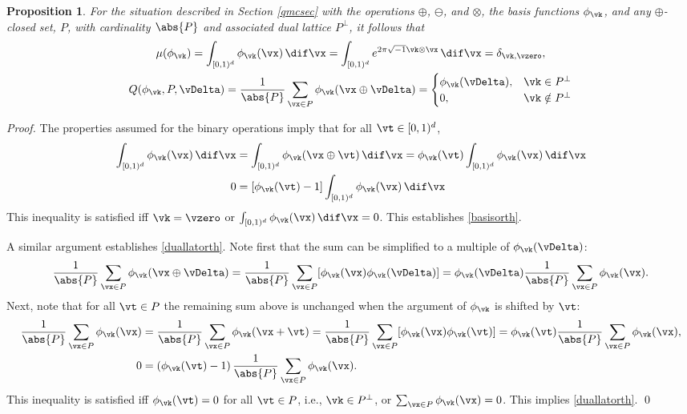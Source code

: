 \documentclass[graybox]{svmult}
\newcommand{\cube}{[0,1)^d}
\newtheorem{prop}[theorem]{Proposition}
\begin{document}
\begin{prop}\label{latnetprop} For the situation described in Section \ref{qmcsec} with the operations $\oplus$, $\ominus$, and $\otimes$, the basis functions $\phi_{\vk}$, and any $\oplus$-closed set, $P$, with cardinality $\abs{P}$ and associated dual lattice $P^{\perp}$, it follows that 
\begin{gather}
\label{basisorth}
\mu(\phi_{\vk})= \int_{\cube} \phi_{\vk}(\vx) \, \dif \vx = \int_{\cube} e^{2 \pi \sqrt{-1} \vk \otimes \vx} \, \dif \vx = \delta_{\vk, \vzero}, \\
\label{duallatorth}
Q(\phi_{\vk},P,\vDelta)= \frac{1}{\abs{P}}\sum_{\vx \in P} \phi_{\vk}(\vx \oplus \vDelta) = \begin{cases} \phi_{\vk}(\vDelta), & \vk \in P^{\perp} \\ 0, & \vk \notin P^{\perp}
\end{cases}
\end{gather}
\end{prop}
\begin{proof}
The properties assumed for the binary operations imply that for all $\vt \in \cube$,
\begin{align*}
\int_{\cube} \phi_{\vk}(\vx) \, \dif \vx &= \int_{\cube} \phi_{\vk}(\vx \oplus \vt) \, \dif \vx = \phi_{\vk}(\vt) \int_{\cube} \phi_{\vk}(\vx) \, \dif \vx\\
0 & = \left [\phi_{\vk}(\vt) -1 \right] \int_{\cube} \phi_{\vk}(\vx) \, \dif \vx
\end{align*}
This inequality is satisfied iff $\vk=\vzero$ or $\int_{\cube} \phi_{\vk}(\vx) \, \dif \vx =0$.  This establishes \eqref{basisorth}. 

A similar argument establishes \eqref{duallatorth}.  Note first that the sum can be simplified to a multiple of $\phi_{\vk}(\vDelta)$:
\begin{equation*}
\frac{1}{\abs{P}}\sum_{\vx \in P} \phi_{\vk}(\vx \oplus \vDelta) 
= \frac{1}{\abs{P}}\sum_{\vx \in P} [\phi_{\vk}(\vx) \phi_{\vk}(\vDelta)] = \phi_{\vk}(\vDelta) \frac{1}{\abs{P}}\sum_{\vx \in P} \phi_{\vk}(\vx).
\end{equation*}
Next, note that for all $\vt \in P$ the remaining sum above is unchanged when the argument of $\phi_{\vk}$ is shifted by $\vt$:
\begin{align*}
\frac{1}{\abs{P}}\sum_{\vx \in P} \phi_{\vk}(\vx) 
& = \frac{1}{\abs{P}}\sum_{\vx \in P} \phi_{\vk}(\vx+\vt) 
= \frac{1}{\abs{P}}\sum_{\vx \in P} [\phi_{\vk}(\vx) \phi_{\vk}(\vt)] 
= \phi_{\vk}(\vt) \frac{1}{\abs{P}}\sum_{\vx \in P} \phi_{\vk}(\vx),\\
0 & = \left (\phi_{\vk}(\vt) -1 \right) \frac{1}{\abs{P}}\sum_{\vx \in P} \phi_{\vk}(\vx).
\end{align*}
This inequality is satisfied iff $\phi_{\vk}(\vt)=0$ for all $\vt \in P$, i.e., $\vk \in P^{\perp}$, or $\sum_{\vx \in P} \phi_{\vk}(\vx) =0$.  This implies \eqref{duallatorth}. \qed
\end{proof}





\end{document}
